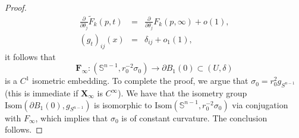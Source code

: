 \documentclass[12pt,twoside]{article}
\theoremstyle{plain}
\theoremstyle{definition}
\theoremstyle{remark}
\numberwithin{equation}{section}
\begin{document}
\begin{proof}
\begin{eqnarray*}
    \frac{\partial}{\partial \theta_{j}} \widetilde{F}_{k}(p,t) &=& \frac{\partial}{\partial \theta_{j}} F_{k}(p,\infty) + o(1),  \\
    (g_{t})_{ij}(x) &=& \delta_{ij} + o_{1}(1),
\end{eqnarray*}
it follows that
\begin{equation*}
    \mathbf{F}_{\infty}: (\mathbb{S}^{n-1}, r_{0}^{-2} \sigma_{0}) \rightarrow \partial B_{1} (0) \subset (U,\delta)
\end{equation*}
is a $C^{1}$ isometric embedding. To complete the proof, we argue that $\sigma_{0}=r_{0}^{2} g_{S^{n-1}}$ (this is immediate if $\mathbf{X}_{\infty}$ is $C^{\infty}$). We have that the isometry group $\text{Isom}(\partial B_{1}(0), g_{S^{n-1}})$ is isomorphic to $\text{Isom}(\mathbb{S}^{n-1}, r_{0}^{-2} \sigma_{0})$ via conjugation with $F_{\infty}$, which implies that $\sigma_{0}$ is of constant curvature. The conclusion follows.


\end{proof} 
\end{document}
